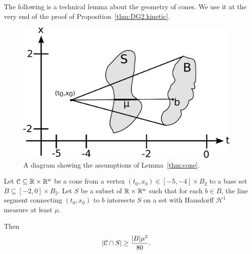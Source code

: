 The following is a technical lemma about the geometry of cones.  We use it at the very end of the proof of Proposition~\ref{thm:DG2.kinetic}.  

\begin{figure}[h]
\centering
\includegraphics[width=.5 \textwidth]{NFP-diagram-Cone}
\caption{A diagram showing the assumptions of Lemma~\ref{thm:cone}.}
\end{figure}

\begin{lemma}\label{thm:cone}
Let $\mathcal{C} \subseteq \mathbb{R} \times \mathbb{R}^n$ be a cone from a vertex $(t_0,x_0) \in [-5, -4] \times B_2$ to a base set $B \subseteq [-2,0]\times B_2$.  %
Let $S$ be a subset of $\mathbb{R}\times\mathbb{R}^n$ such that for each $b \in B$, the line segment connecting $(t_0,x_0)$ to $b$ intersects $S$ on a set with Hausdorff $\mathcal{H}^1$ measure at least $\mu$.  

Then 
\[ \left\lvert \mathcal{C} \cap S \right\rvert \geq \frac{ |B| \mu^2}{80}. \]
\end{lemma}

